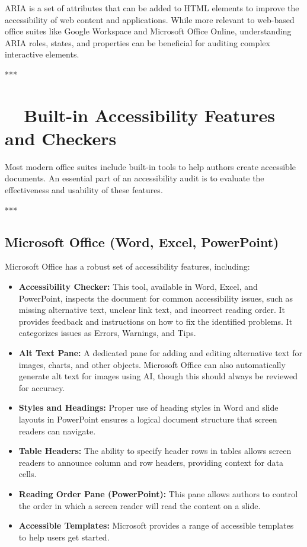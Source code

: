 \gls{ARIA} is a set of attributes that can be added to HTML elements to improve the accessibility of web content and applications. While more relevant to web-based office suites like Google Workspace and Microsoft Office Online, understanding \gls{ARIA} roles, states, and properties can be beneficial for auditing complex interactive elements\supercite{w3caria}.

***

\section{~~Built-in Accessibility Features and Checkers}
\label{sec:built-in-accessibility-features-and-checkers}

Most modern office suites include built-in tools to help authors create accessible documents. An essential part of an accessibility audit is to evaluate the effectiveness and usability of these features.

***

\subsection{Microsoft Office (Word, Excel, PowerPoint)}
\label{sub:microsoft-office-word-excel-powerpoint}

Microsoft Office has a robust set of accessibility features, including\supercite{MicrosoftAccessibility}:
\begin{itemize}
	\item \textbf{Accessibility Checker:} This tool, available in Word, Excel, and PowerPoint, inspects the document for common accessibility issues, such as missing alternative text, unclear link text, and incorrect reading order. It provides feedback and instructions on how to fix the identified problems. It categorizes issues as Errors, Warnings, and Tips.
	\item \textbf{Alt Text Pane:} A dedicated pane for adding and editing alternative text for images, charts, and other objects. Microsoft Office can also automatically generate alt text for images using AI, though this should always be reviewed for accuracy.
	\item \textbf{Styles and Headings:} Proper use of heading styles in Word and slide layouts in PowerPoint ensures a logical document structure that screen readers can navigate.
	\item \textbf{Table Headers:} The ability to specify header rows in tables allows screen readers to announce column and row headers, providing context for data cells.
	\item \textbf{Reading Order Pane (PowerPoint):} This pane allows authors to control the order in which a screen reader will read the content on a slide.
	\item \textbf{Accessible Templates:} Microsoft provides a range of accessible templates to help users get started.
\end{itemize}

